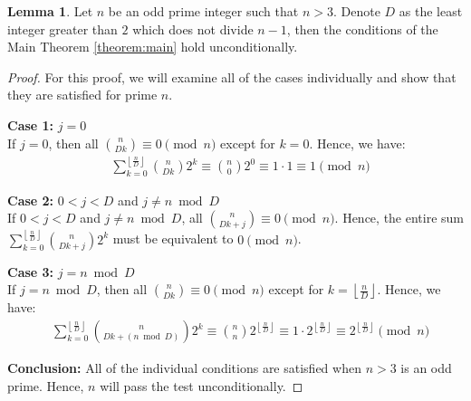 \documentclass{article}
\theoremstyle{plain}
\theoremstyle{definition}
\newtheorem{lemma}{Lemma}
\newcommand{\floor}[1]{\left\lfloor #1 \right\rfloor}
\begin{document}
\begin{lemma} \label{lemma:primes}
Let $n$ be an odd prime integer such that $n > 3$. Denote $D$ as the least integer greater than $2$ which does not divide $n-1$, then the conditions of the Main Theorem \ref{theorem:main} hold unconditionally.
\end{lemma}
\begin{proof}
For this proof, we will examine all of the cases individually and show that they are satisfied for prime $n$.

\textbf{Case 1:} $j=0$ \\
If $j = 0$, then all $\binom{n}{D k} \equiv 0 \pmod{n}$ except for $k=0$. Hence, we have:
\begin{align}
    & \sum_{k=0}^{\floor{\frac{n}{D}}} \binom{n}{D k} 2^{k} \equiv \binom{n}{0} 2^{0} \equiv 1 \cdot 1 \equiv 1 \pmod{n}
\end{align}

\textbf{Case 2:} $0 < j < D$ and $j \neq n \bmod{D}$ \\
If $0 < j < D$ and $j \neq n \bmod{D}$, all $\binom{n}{D k + j} \equiv 0 \pmod{n}$. Hence, the entire sum $\sum_{k=0}^{\floor{\frac{n}{D}}} \binom{n}{D k + j} 2^{k}$ must be equivalent to $0 \pmod{n}$.

\textbf{Case 3:} $j=n \bmod{D}$ \\
If $j = n \bmod{D}$, then all $\binom{n}{D k} \equiv 0 \pmod{n}$ except for $k=\floor{\frac{n}{D}}$. Hence, we have:
\begin{align}
    & \sum_{k=0}^{\floor{\frac{n}{D}}} \binom{n}{D k + (n \bmod{D})} 2^{k} \equiv \binom{n}{n} 2^{\floor{\frac{n}{D}}} \equiv 1 \cdot 2^{\floor{\frac{n}{D}}} \equiv 2^{\floor{\frac{n}{D}}} \pmod{n}
\end{align}

\textbf{Conclusion:}
All of the individual conditions are satisfied when $n > 3$ is an odd prime. Hence, $n$ will pass the test unconditionally.
\end{proof}
\end{document}
